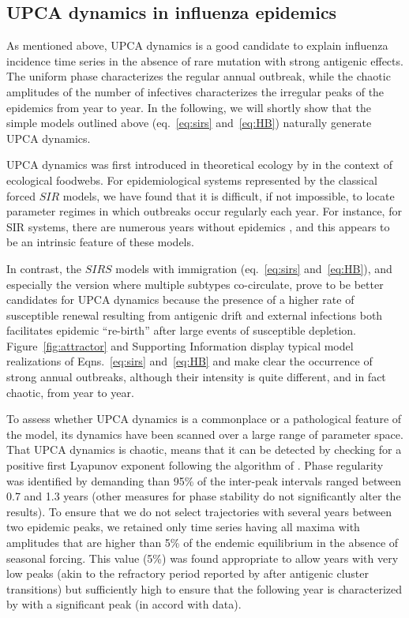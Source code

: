 \subsection{UPCA dynamics in influenza epidemics}
\label{sec:res_upca}

As mentioned above, UPCA dynamics is a good candidate to explain
influenza incidence time series in the absence of rare mutation with
strong antigenic effects. The uniform phase characterizes the regular
annual outbreak, while the chaotic amplitudes of the number of
infectives characterizes the irregular peaks of the epidemics from
year to year. In the following, we will shortly show that the simple
models outlined above (eq.~\eqref{eq:sirs} and~\eqref{eq:HB})
naturally generate UPCA dynamics.

UPCA dynamics was first introduced in theoretical ecology by
\citet{Blasius1999} in the context of ecological foodwebs. For
epidemiological systems represented by the classical forced $SIR$
models, we have found that it is difficult, if not impossible, to
locate parameter regimes in which outbreaks occur regularly each
year. For instance, for SIR systems, there are numerous years without
epidemics \citep{Stone2007a, Olinky2008}, and this appears to be an
intrinsic feature of these models.

In contrast, the $SIRS$ models with immigration (eq.~\eqref{eq:sirs}
and~\eqref{eq:HB}), and especially the version where multiple subtypes
co-circulate, prove to be better candidates for UPCA dynamics because
the presence of a higher rate of susceptible renewal resulting from
antigenic drift and external infections both facilitates epidemic
``re-birth'' after large events of susceptible depletion.
Figure~\ref{fig:attractor} and Supporting Information display typical
model realizations of Eqns.~\eqref{eq:sirs} and~\eqref{eq:HB} and make
clear the occurrence of strong annual outbreaks, although their
intensity is quite different, and in fact chaotic, from year to year.

To assess whether UPCA dynamics is a commonplace or a pathological
feature of the model, its dynamics have been scanned over a large
range of parameter space. That UPCA dynamics is chaotic, means that it
can be detected by checking for a positive first Lyapunov exponent
following the algorithm of \citet{Wolf1985}. Phase regularity was
identified by demanding than 95\% of the inter-peak intervals ranged
between 0.7 and 1.3 years (other measures for phase stability do not
significantly alter the results). To ensure that we do not select
trajectories with several years between two epidemic peaks, we
retained only time series having all maxima with amplitudes that are
higher than 5\% of the endemic equilibrium in the absence of seasonal
forcing. This value (5\%) was found appropriate to allow years with
very low peaks (akin to the refractory period reported by
\citet{Koelle2006} after antigenic cluster transitions) but
sufficiently high to ensure that the following year is characterized
by with a significant peak (in accord with data).

